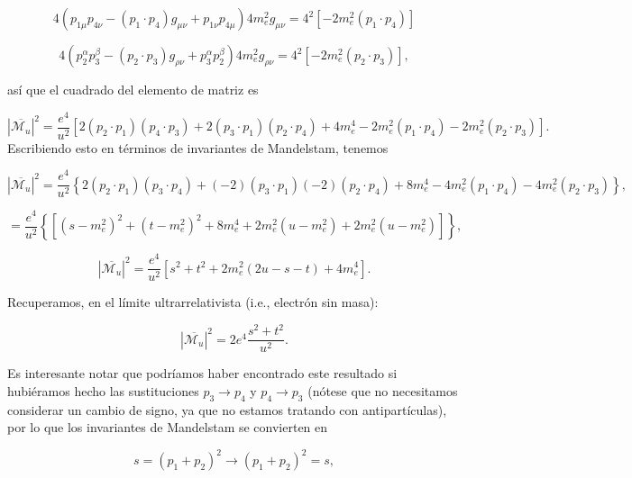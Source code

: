 \begin{equation}
4(p_{1\mu}p_{4\nu} - (p_1\cdot p_4)g_{\mu\nu} + p_{1\nu}p_{4\mu})4m_e^2g_{\mu\nu} = 4^2[-2m_e^2(p_1\cdot p_4)]
\end{equation}

\begin{equation}
4(p_2^\alpha p_3^\beta - (p_2\cdot p_3)g_{\rho\nu} + p_3^\alpha p_2^\beta)4m_e^2g_{\rho\nu} = 4^2[-2m_e^2(p_2\cdot p_3)],
\end{equation}

así que el cuadrado del elemento de matriz es

\begin{equation}
|\overline{\mathcal{M}_u}|^2 = \frac{e^4}{u^2} \left[ 2(p_2 \cdot p_1)(p_4 \cdot p_3) + 2(p_3 \cdot p_1)(p_2 \cdot p_4) + 4m_e^4 - 2m_e^2(p_1 \cdot p_4) - 2m_e^2(p_2 \cdot p_3) \right].
\end{equation}
Escribiendo esto en términos de invariantes de Mandelstam, tenemos

\begin{equation}
|\overline{\mathcal{M}_u}|^2 = \frac{e^4}{u^2} \left\{ 2(p_2 \cdot p_1)(p_3 \cdot p_4) + (-2)(p_3 \cdot p_1)(-2)(p_2 \cdot p_4) + 8m_e^4 - 4m_e^2(p_1 \cdot p_4) - 4m_e^2(p_2 \cdot p_3) \right\},
\end{equation}

\begin{equation}
= \frac{e^4}{u^2} \left\{ [(s - m_e^2)^2 + (t - m_e^2)^2 + 8m_e^4 + 2m_e^2(u - m_e^2) + 2m_e^2(u - m_e^2)] \right\},
\end{equation}

\begin{equation}
|\overline{\mathcal{M}_u}|^2 = \frac{e^4}{u^2} \left[ s^2 + t^2 + 2m_e^2(2u - s - t) + 4m_e^4 \right].
\end{equation}

Recuperamos, en el límite ultrarrelativista (i.e., electrón sin masa):

\begin{equation}
|\overline{\mathcal{M}_u}|^2 = 2e^4 \frac{s^2 + t^2}{u^2}.
\end{equation}

Es interesante notar que podríamos haber encontrado este resultado si hubiéramos hecho las sustituciones $ p_3 \to p_4 $ y $ p_4 \to p_3 $ (nótese que no necesitamos considerar un cambio de signo, ya que no estamos tratando con antipartículas), por lo que los invariantes de Mandelstam se convierten en

\begin{equation}
s = (p_1 + p_2)^2 \rightarrow (p_1 + p_2)^2 = s,
\end{equation}

